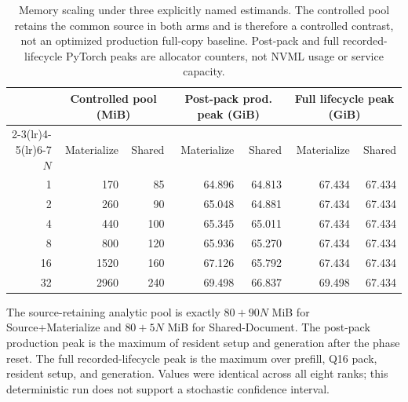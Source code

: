 \begin{table}[H]
\caption{Memory scaling under three explicitly named estimands. The controlled pool retains the common source in both arms and is therefore a controlled contrast, not an optimized production full-copy baseline. Post-pack and full recorded-lifecycle PyTorch peaks are allocator counters, not NVML usage or service capacity.}
\label{tab:capacity}
\centering
\footnotesize
\setlength{\tabcolsep}{3.0pt}
\begin{tabular}{@{}r rr rr rr@{}}
\toprule
& \multicolumn{2}{c}{Controlled pool (MiB)} & \multicolumn{2}{c}{Post-pack prod. peak (GiB)} & \multicolumn{2}{c}{Full lifecycle peak (GiB)} \\
\cmidrule(lr){2-3}\cmidrule(lr){4-5}\cmidrule(lr){6-7}
$N$ & Materialize & Shared & Materialize & Shared & Materialize & Shared \\
\midrule
1 & 170 & 85 & 64.896 & 64.813 & 67.434 & 67.434 \\
2 & 260 & 90 & 65.048 & 64.881 & 67.434 & 67.434 \\
4 & 440 & 100 & 65.345 & 65.011 & 67.434 & 67.434 \\
8 & 800 & 120 & 65.936 & 65.270 & 67.434 & 67.434 \\
16 & 1520 & 160 & 67.126 & 65.792 & 67.434 & 67.434 \\
32 & 2960 & 240 & 69.498 & 66.837 & 69.498 & 67.434 \\
\bottomrule
\end{tabular}
\vspace{1mm}
\parbox{0.97\textwidth}{\footnotesize The source-retaining analytic pool is exactly $80+90N$ MiB for Source+Materialize and $80+5N$ MiB for Shared-Document. The post-pack production peak is the maximum of resident setup and generation after the phase reset. The full recorded-lifecycle peak is the maximum over prefill, Q16 pack, resident setup, and generation. Values were identical across all eight ranks; this deterministic run does not support a stochastic confidence interval.}
\end{table}
